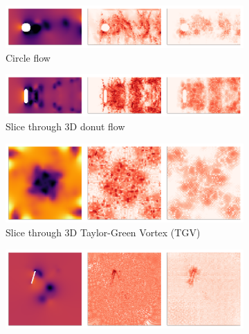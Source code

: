 \documentclass[]{elsarticle}
\begin{document}
\begin{figure}
    \centering
    \begin{subfigure}[a]{\textwidth}
        \centering 
        \includegraphics[width=\textwidth]{figures/circletriple.png}
        \caption[-1mm]{Circle flow}
    \end{subfigure}
    \begin{subfigure}[b]{\textwidth}
    
        \centering
        \includegraphics[width=\textwidth]{figures/donuttriple.png}
        \caption{Slice through 3D donut flow}
    \end{subfigure}
    \begin{subfigure}[c]{\textwidth}
        \centering
        \includegraphics[width=\textwidth,trim={0 150 0 0},clip=true]{figures/TGVtriple.png}
        \caption{Slice through 3D Taylor-Green Vortex (TGV)}
    \end{subfigure}
    \begin{subfigure}[c]{\textwidth}
        \centering
        \includegraphics[width=\textwidth,trim={0 100 0 60},clip=true]{figures/wingtriple.png}

\end{subfigure}
\end{figure}
\end{document}
